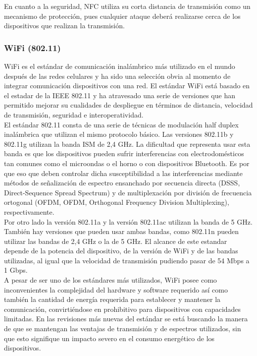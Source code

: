 En cuanto a la seguridad, NFC utiliza su corta distancia de transmisión como un mecanismo de protección, pues cualquier ataque deberá realizarse cerca de los dispositivos que realizan la transmisión. 

\subsubsection{WiFi (802.11)} 
WiFi es el estándar de comunicación inalámbrico más utilizado en el mundo después de las redes celulares y ha sido una selección obvia al momento de integrar comunicación dispositivos con una red. El estándar WiFi está basado en el estadar de la IEEE 802.11\cite{ieee80211} y ha atravesado una serie de versiones que han permitido mejorar su cualidades de despliegue en términos de distancia, velocidad de transmisión, seguridad e interoperatividad.\\  

El estándar 802.11 consta de una serie de técnicas de modulación half duplex inalámbrica que utilizan el mismo protocolo básico. Las versiones 802.11b y 802.11g utilizan la banda ISM de 2,4 GHz. La dificultad que representa usar esta banda es que los dispositivos pueden sufrir interferencias con electrodomésticos tan comunes como el microondas o el horno o con dispositivos Bluetooth. Es por que eso que deben controlar dicha susceptibilidad a las interferencias mediante métodos de señalización de espectro ensanchado por secuencia directa (DSSS, Direct-Sequence Spread Spectrum) y de multiplexación por división de frecuencia ortogonal (OFDM, OFDM, Orthogonal Frequency Division Multiplexing), respectivamente.\\

Por otro lado la versión 802.11a y la versión 802.11ac utilizan la banda de 5 GHz. También hay versiones que pueden usar ambas bandas, como 802.11n pueden utilizar las bandas de 2,4 GHz o la de 5 GHz. El alcance de este estandar depende de la potencia del dispositivo, de la versión de WiFi y de las bandas utilizadas, al igual que la velocidad de transmisión pudiendo pasar de 54 Mbps a 1 Gbps. \\

A pesar de ser uno de los estándares más utilizados, WiFi posee como inconvenientes la complejidad del hardware y software requerido así como también la cantidad de energía requerida para establecer y mantener la comunicación, convirtiéndose en prohibitivo para dispositivos con capacidades limitadas. En las revisiones más nuevas del estándar se está buscando la manera de que se mantengan las ventajas de transmisión y de espectros utilizados, sin que esto signifique un impacto severo en el consumo energético de los dispositivos. 

